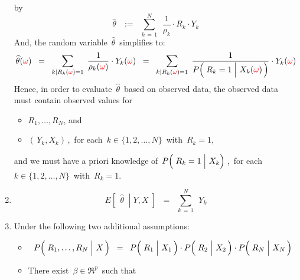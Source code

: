 \begin{proposition}
\begin{enumerate}
	by
	\begin{equation*}
	\widehat{\theta}
	\,\;\; := \;\;
		\overset{N}{\underset{k\,=\,1}{\sum}}\;\,
		\dfrac{1}{\rho_{k}} \cdot R_{k} \cdot Y_{k}
	\end{equation*}
	And, the random variable \,$\widehat{\theta}$\, simplifies to:
	\begin{equation*}
	\widehat{\theta}({\color{red}\omega})
	\;\; = \;\;
		\underset{k\vert R_{k}({\color{red}\omega})=1}{\sum}\;\,
		\dfrac{1}{\rho_{k}({\color{red}\omega})} \cdot Y_{k}({\color{red}\omega})
	\;\; = \;\;
		\underset{k\vert R_{k}({\color{red}\omega})=1}{\sum}\;\,
		\dfrac{
			1
			}{
			P\!\left(\,
				\left.\overset{{\color{white}.}}{R}_{k}=1
				\;\right\vert\,
				X_{k}({\color{red}\omega})
				\,\right)
			}
		\cdot
		Y_{k}({\color{red}\omega})
	\end{equation*}
	Hence, in order to evaluate \,$\widehat{\theta}$\, based on observed data,
	the observed data must contain observed values for
	\begin{itemize}
	\item
		$R_{1}, \ldots, R_{N}$, and
	\item
		$(\,Y_{k},X_{k})$\,,\, for each \,$k \in \{1,2,\ldots,N\}$\, with \,$R_{k} = 1$,
	\end{itemize}
	and we must have a priori knowledge of 
	\,$P\!\left(\,\left.\overset{{\color{white}.}}{R}_{k}=1\;\right\vert\,X_{k}\right)$\,,\,
	for each \,$k \in \{1,2,\ldots,N\}$\, with \,$R_{k} = 1$.
\item
	\begin{equation*}
	E\!\left[\;\,\left.\widehat{\theta}\;\;\right\vert\;Y,X\;\right]
	\;\; = \;\;
		\overset{N}{\underset{k\,=\,1}{\sum}}\;\, Y_{k}	
	\end{equation*}
\item
	Under the following two additional assumptions:
	\begin{itemize}
	\item
		\begin{equation*}
		P\!\left(\,\left.\overset{{\color{white}.}}{R}_{1},\ldots,R_{N} \;\right\vert\, X\,\right)
		\;\; = \;\;
		P\!\left(\,\left.\overset{{\color{white}.}}{R}_{1} \;\right\vert\, X_{1}\,\right)
		\cdot
		P\!\left(\,\left.\overset{{\color{white}.}}{R}_{2} \;\right\vert\, X_{2}\,\right)
		\cdot
		P\!\left(\,\left.\overset{{\color{white}.}}{R}_{N} \;\right\vert\, X_{N}\,\right)
		\end{equation*}
	\item
		There exist \,$\beta \in \Re^{p}$\, such that
		\begin{eqnarray*}

\end{eqnarray*}
\end{itemize}
\end{enumerate}
\end{proposition}
